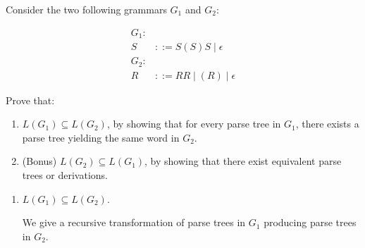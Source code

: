 \begin{exercise}{}

  Consider the two following grammars \(G_1\) and \(G_2\):

  \begin{align*}
    G_1: & \\
    S &::= S(S)S \mid \epsilon \\
    G_2: & \\
    R &::= RR \mid (R) \mid \epsilon
  \end{align*}

  \noindent
  Prove that:
  \begin{enumerate}
    \item \(L(G_1) \subseteq L(G_2)\), by showing that for every parse tree in
    \(G_1\), there exists a parse tree yielding the same word in \(G_2\).
    \item (Bonus) \(L(G_2) \subseteq L(G_1)\), by showing that there exist
    equivalent parse trees or derivations.
  \end{enumerate}

  \begin{solution}

    \begin{enumerate}
      \item \(L(G_1) \subseteq L(G_2)\).
      
      We give a recursive transformation of parse trees in \(G_1\) producing
      parse trees in \(G_2\). 


\end{enumerate}
\end{solution}
\end{exercise}
